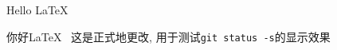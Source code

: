 \documentclass{ctexart}
\begin{document}
    Hello \LaTeX~

    你好\LaTeX~ %
    这是正式地更改, 用于测试\verb|git status -s|的显示效果
\end{document}
